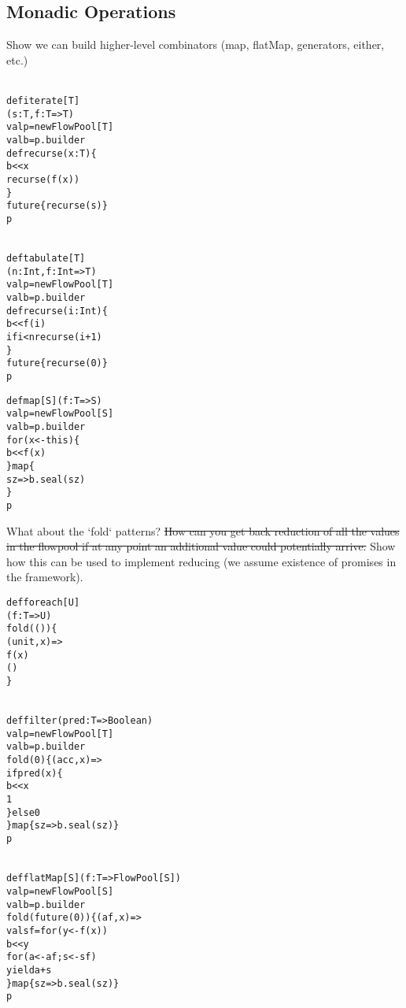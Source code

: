 \documentclass[runningheads,a4paper]{llncs}
\begin{document}
\subsection{Monadic Operations}

Show we can build higher-level combinators (map, flatMap, generators,
either, etc.)


\begin{minipage}[b]{3.75 cm}
\begin{alltt}
{\scriptsize
def iterate[T]
  (s: T, f: T => T)
  val p = new FlowPool[T]
  val b = p.builder
  def recurse(x: T) \{
    b << x
    recurse(f(x))
  \}
  future \{ recurse(s) \}
  p
}
\end{alltt}
\end{minipage}
\begin{minipage}[b]{4 cm}
\begin{alltt}
{\scriptsize
def tabulate[T]
  (n: Int, f: Int => T)
  val p = new FlowPool[T]
  val b = p.builder
  def recurse(i: Int) \{
    b << f(i)
    if i < n recurse(i + 1)
  \}
  future \{ recurse(0) \}
  p
}
\end{alltt}
\end{minipage}\begin{minipage}[b]{4 cm}
\begin{alltt}
{\scriptsize
def map[S](f: T => S)
  val p = new FlowPool[S]
  val b = p.builder
  for (x <- this) \{
    b << f(x)
  \} map \{
    sz => b.seal(sz)
  \}
  p

}
\end{alltt}
\end{minipage}

What about the `fold` patterns? \sout{How can you get back reduction of all
the values in the flowpool if at any point an additional value could
potentially arrive.} Show how this can be used to implement reducing (we
assume existence of promises in the framework).

\begin{minipage}[b]{2.5 cm}
\begin{alltt}
{\scriptsize
def foreach[U]
  (f: T => U)
  fold(()) \{
    (unit, x) =>
    f(x)
    ()
  \}



}
\end{alltt}
\end{minipage}
\begin{minipage}[b]{4.25 cm}
\begin{alltt}
{\scriptsize
def filter(pred: T => Boolean)
  val p = new FlowPool[T]
  val b = p.builder
  fold(0) \{ (acc, x) =>
    if pred(x) \{
      b << x
      1
    \} else 0
  \} map \{ sz => b.seal(sz) \}
  p
}
\end{alltt}
\end{minipage}\begin{minipage}[b]{4.5 cm}
\begin{alltt}
{\scriptsize
def flatMap[S](f: T => FlowPool[S])
  val p = new FlowPool[S]
  val b = p.builder
  fold(future(0)) \{ (af, x) =>
    val sf = for (y <- f(x))
      b << y
    for (a <- af; s <- sf)
      yield a + s
  \} map \{ sz => b.seal(sz) \}
  p
}
\end{alltt}
\end{minipage}
\end{document}

